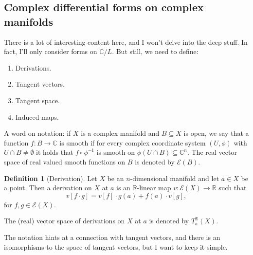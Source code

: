 \documentclass{article}
\theoremstyle{definition}
\newtheorem{defi}{Definition}
\begin{document}
\subsection{Complex differential forms on complex manifolds}
There is a lot of interesting content here, and I won't delve into the deep stuff. In fact, I'll only consider forms on $\mathbb{C}/L$. But still, we need to define:
\begin{enumerate}
  \item Derivations.
  \item Tangent vectors.
  \item Tangent space.
  \item Induced maps.
\end{enumerate}
A word on notation: if $X$ is a complex manifold and $B\subseteq X$ is open, we say that a function $f:B\to\mathbb{C}$ is smooth if for every complex coordinate system $(U,\phi)$ with $U\cap B\neq\emptyset$ it holds that $f\circ\phi^{-1}$ is smooth on $\phi(U\cap B)\subseteq\mathbb{C}^n$. The real vector space of real valued smooth functions on $B$ is denoted by $\mathcal{E}(B)$.
\begin{defi}[Derivation]
  Let $X$ be an $n$-dimensional manifold and let $a\in X$ be a point. Then a derivation on $X$ at $a$ is an $\mathbb{R}$-linear map $v:\mathcal{E}(X)\to\mathbb{R}$ such that
  \[v[f\cdot g]=v[f]\cdot g(a)+f(a)\cdot v[g],\]
  for $f,g\in\mathcal{E}(X)$.

  The (real) vector space of derivations on $X$ at $a$ is denoted by $T^\mathbb{R}_a(X)$.
\end{defi}
The notation hints at a connection with tangent vectors, and there is an isomorphisms to the space of tangent vectors, but I want to keep it simple.
\end{document}
